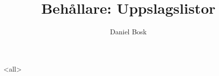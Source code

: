 \documentclass[ignoreframetext]{beamer}
\begin{document}
\title{%
  Behållare: Uppslagslistor
}
\author{Daniel Bosk}

\begin{frame}
  \maketitle
\end{frame}

\mode<all>

\mode*
%

\end{document}

